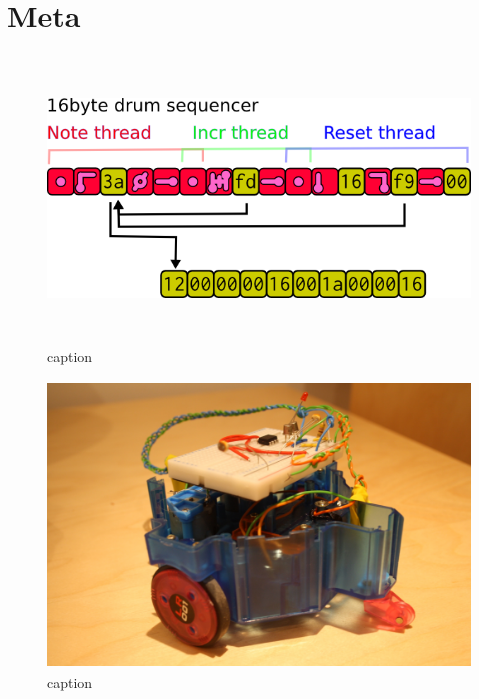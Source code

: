 \documentclass[letterpaper, 12pt]{article}
\begin{document}
\section{Meta}
\label{sec:meta}


\begin{figure}
	\centering
		\includegraphics[height=3in]{../fig/bbds-seq.png}
	\caption{caption}
	\label{fig:fig_bbds-seq}
\end{figure}


\begin{figure}
	\centering
		\includegraphics[height=3in]{../fig/bbbot.JPG}
	\caption{caption}
	\label{fig:fig_bbbot}
\end{figure}





\vspace*{24pt}





\vspace*{24pt}
\end{document}
